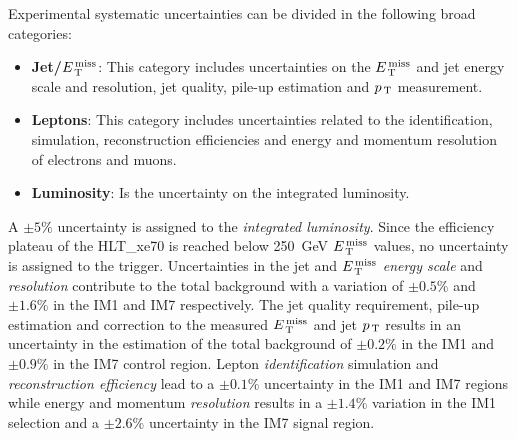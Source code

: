 Experimental systematic uncertainties can be divided in the following broad
categories:
\begin{itemize}
\item \textbf{Jet/$E_\mathrm{\, T}^\mathrm{\, miss}$}: This category includes uncertainties on the $E_\mathrm{\, T}^\mathrm{\, miss}$
  and jet energy scale and resolution, jet quality, pile-up estimation and
  $p_\mathrm{\, T}$ measurement.
\item \textbf{Leptons}: This category includes uncertainties related to the
  identification, simulation, reconstruction efficiencies and energy and
  momentum resolution of electrons and muons.
\item \textbf{Luminosity}: Is the uncertainty on the integrated luminosity.
\end{itemize}
A $\pm 5\%$ uncertainty is assigned to the \emph{integrated luminosity}. Since
the efficiency plateau of the HLT\_xe70 is reached below 250~GeV $E_\mathrm{\, T}^\mathrm{\, miss}$ values,
no uncertainty is assigned to the trigger. Uncertainties in the jet and $E_\mathrm{\, T}^\mathrm{\, miss}$
\emph{energy scale} and \emph{resolution} contribute to the total background
with a variation of $\pm 0.5\%$ and $\pm 1.6\%$ in the IM1 and IM7
respectively. The jet quality requirement, pile-up estimation and correction to
the measured $E_\mathrm{\, T}^\mathrm{\, miss}$ and jet $p_\mathrm{\, T}$ results in an uncertainty in the estimation of
the total background of $\pm 0.2\%$ in the IM1 and $\pm 0.9 \%$ in the IM7
control region. Lepton \emph{identification} simulation and
\emph{reconstruction efficiency} lead to a $\pm 0.1\%$ uncertainty in the IM1
and IM7 regions while energy and momentum \emph{resolution} results in a $\pm
1.4\%$ variation in the IM1 selection and a $\pm 2.6\%$ uncertainty in the IM7
signal region.
